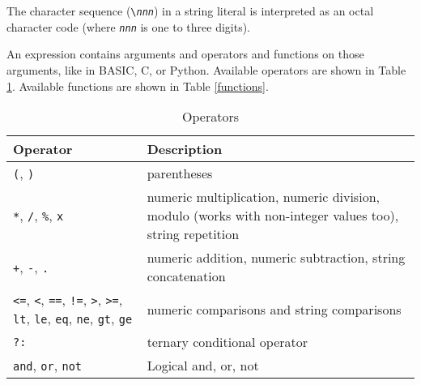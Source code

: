 The character sequence (\texttt{\textbackslash{}\textit{nnn}}) in
a string literal is interpreted as an octal character code (where
\texttt{\textit{nnn}} is one to three digits).

An expression contains arguments and operators and functions
on those arguments, like in BASIC, C, or Python.
Available operators are shown in Table \ref{operators}.
Available functions are shown in Table \ref{functions}.


\begin{table}[htb]
\begin{tabular}{|l|p{7cm}|}
\hline
Operator & Description \\
\hline
\hline

\texttt{(}, \texttt{)} & parentheses \\

\hline

\texttt{*}, \texttt{/}, \texttt{\%}, \texttt{x} &
numeric multiplication, numeric division, modulo (works
with non-integer values too), string repetition \\

\hline

\texttt{+}, \texttt{-}, \texttt{.} & numeric addition,
numeric subtraction, string concatenation \\

\hline

\texttt{<=}, \texttt{<}, \texttt{==},
\texttt{!=}, \texttt{>}, \texttt{>=},
\texttt{lt}, \texttt{le}, \texttt{eq},
\texttt{ne}, \texttt{gt}, \texttt{ge} &
numeric comparisons and string comparisons \\

\hline

\texttt{?:} & ternary conditional operator \\

\hline

\texttt{and},
\texttt{or},
\texttt{not} &
Logical and, or, not \\

\hline

\end{tabular}
\caption{Operators}
\label{operators}
\end{table}


